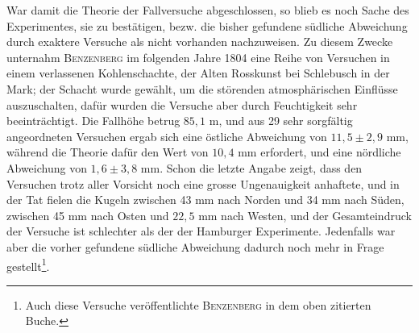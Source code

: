 \clearpage\begingroup{}
\renewcommand{\thefootnote}{\arabic{footnote})}\setcounter{footnote}{8}
\begin{center}\end{center}
\noindent\hspace*{\parindent}War damit die Theorie der Fallversuche abgeschlossen, so blieb es noch
Sache des Experimentes, sie zu bestätigen, bezw. die bisher gefundene südliche
Abweichung durch exaktere Versuche als nicht vorhanden nachzuweisen.
Zu diesem Zwecke unternahm \textsc{Benzenberg} im folgenden Jahre 1804 eine Reihe
von Versuchen in einem verlassenen Kohlenschachte, der Alten Rosskunst bei
Schlebusch in der Mark; der Schacht wurde gewählt, um die störenden atmosphärischen
Einflüsse auszuschalten, dafür wurden die Versuche aber durch
Feuchtigkeit sehr beeinträchtigt. Die Fallhöhe betrug $85{,}1$ m, und aus 29
sehr sorgfältig angeordneten Versuchen ergab sich eine östliche Abweichung
von $11{,}5\pm2{,}9$ mm, während die Theorie dafür den Wert von $10{,}4$ mm erfordert,
und eine nördliche Abweichung von $1{,}6\pm3{,}8$ mm. Schon die letzte
Angabe zeigt, dass den Versuchen trotz aller Vorsicht noch eine grosse
Ungenauigkeit anhaftete, und in der Tat fielen die Kugeln zwischen 43 mm
nach Norden und 34 mm nach Süden, zwischen 45 mm nach Osten und
$22{,}5$ mm nach Westen, und der Gesamteindruck der Versuche ist schlechter
als der der Hamburger Experimente. Jedenfalls war aber die vorher gefundene
südliche Abweichung dadurch noch mehr in Frage gestellt\footnote{Auch diese Versuche veröffentlichte \textsc{Benzenberg} in dem oben zitierten Buche.}.


